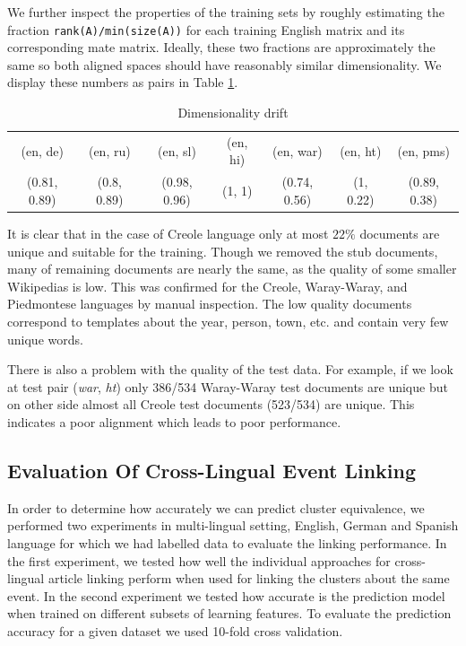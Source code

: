 \documentclass[twoside,11pt]{article}
\begin{document}
We further inspect the properties of the training sets by roughly estimating the fraction \texttt{rank(A)/min(size(A))} for each training English matrix and its corresponding mate matrix. Ideally, these two fractions are approximately the same so  both aligned spaces should have reasonably similar dimensionality. We display these numbers as pairs in Table \ref{table:rank}.

\begin{table}[h]
\caption{Dimensionality drift}
\label{table:rank}
\begin{tabular}{|c|c|c|c|c|c|c|}
\cline{1-7}
(en, de)     &   (en, ru)     &   (en, sl)       &     (en, hi)&   (en, war)      &      (en, ht) &   (en, pms)\\
\cline{1-7}
(0.81, 0.89)   &  (0.8, 0.89)  &   (0.98, 0.96)    &    (1, 1)  &   (0.74, 0.56)  &      (1, 0.22)  &   (0.89, 0.38)\\
\cline{1-7}
\end{tabular}
\end{table}

It is clear that in the case of Creole language only at most $22\%$ documents are unique and suitable for the training. Though we removed the stub documents, many of remaining documents are nearly the same, as the quality of some smaller Wikipedias is low. This was confirmed for the Creole, Waray-Waray, and Piedmontese languages by manual inspection. The low quality documents correspond to templates about the year, person, town, etc. and contain very few unique words.

There is also a problem with the quality of the test data. For example, if we look at test pair (\emph{war}, \emph{ht}) only 386/534 Waray-Waray test documents are unique but on other side almost all Creole test documents (523/534) are unique. This indicates a poor alignment which leads to poor performance.

\subsection{Evaluation Of Cross-Lingual Event Linking}
In order to determine how accurately we can predict cluster equivalence, we performed two experiments in multi-lingual setting, English, German and Spanish language for which we had labelled data to evaluate the linking performance. In the first experiment, we tested how well  the individual approaches for cross-lingual article linking perform when used for linking the clusters about the same event. In the second experiment we tested how accurate is the prediction model when trained on different subsets of learning features. To evaluate the prediction accuracy for a given dataset we used 10-fold cross validation.
\end{document}
